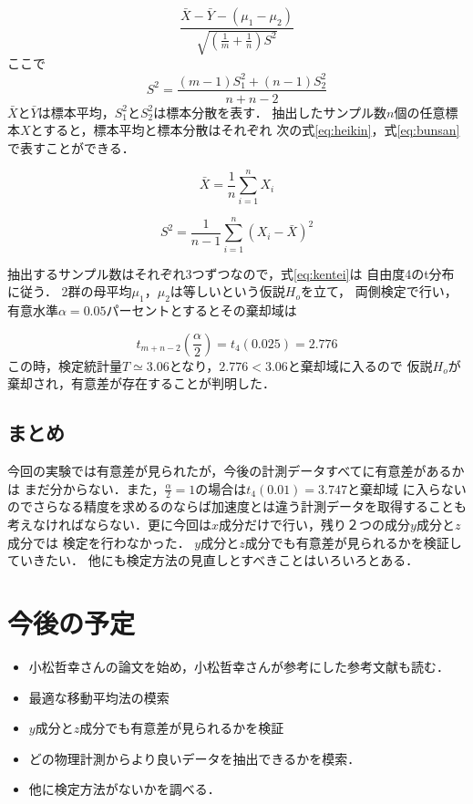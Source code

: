 \begin{equation}
    \frac{\bar{X} - \bar{Y} - (\mu_1 - \mu_2)}{\sqrt{(\frac{1}{m} + \frac{1}{n})S^2}}
    \label{eq:kentei}
\end{equation}
ここで
\begin{equation}
    S^2 = \frac{(m - 1)S_1^2 + (n - 1)S_2^2 }{n + n - 2}
    \label{eq:kentei}
\end{equation}
$\bar{X}$と$\bar{Y}$は標本平均，$S_1^2$と$S_2^2$は標本分散を表す．
抽出したサンプル数$n$個の任意標本$X$とすると，標本平均と標本分散はそれぞれ
次の式\ref{eq:heikin}，式\ref{eq:bunsan}で表すことができる．

\begin{equation}
    \bar{X} = \frac{1}{n}\sum_{i=1}^{n}X_i
    \label{eq:heikin}
\end{equation}

\begin{equation}
    S^2 = \frac{1}{n - 1}\sum_{i=1}^{n}(X_i - \bar{X})^2
    \label{eq:bunsan}
\end{equation}

抽出するサンプル数はそれぞれ3つずつなので，式\ref{eq:kentei}は
自由度4のt分布に従う．
2群の母平均$\mu_1，\mu_2$は等しいという仮説$H_o$を立て，
両側検定で行い，有意水準$\alpha = 0.05$パーセントとするとその棄却域は

\begin{equation}
    t_{m + n - 2}(\frac{\alpha}{2}) = t_4(0.025) = 2.776
    \label{eq:kikyaku}
\end{equation}
この時，検定統計量$T \simeq 3.06$となり，$2.776 < 3.06$と棄却域に入るので
仮説$H_o$が棄却され，有意差が存在することが判明した．

\subsection{まとめ}
今回の実験では有意差が見られたが，今後の計測データすべてに有意差があるかは
まだ分からない．また，$\frac{\alpha}{2} = 1$の場合は$t_4(0.01) = 3.747$と棄却域
に入らないのでさらなる精度を求めるのならば加速度とは違う計測データを取得することも
考えなければならない．更に今回は$x$成分だけで行い，残り２つの成分$y$成分と$z$成分では
検定を行わなかった．
$y$成分と$z$成分でも有意差が見られるかを検証していきたい．
他にも検定方法の見直しとすべきことはいろいろとある．

\section{今後の予定}
\begin{itemize}
    \item 小松哲幸さんの論文を始め，小松哲幸さんが参考にした参考文献も読む．
    \item 最適な移動平均法の模索
    \item $y$成分と$z$成分でも有意差が見られるかを検証
    \item どの物理計測からより良いデータを抽出できるかを模索．
    \item 他に検定方法がないかを調べる．
\end{itemize}

